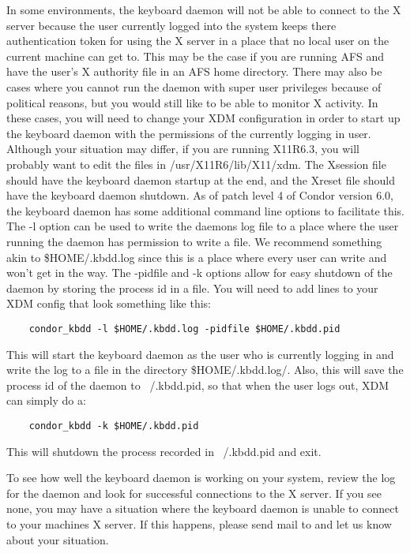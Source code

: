 In some environments, the keyboard daemon will not be able to connect to the X
server because the user currently logged into the system keeps there
authentication token for using the X server in a place that no local user on
the current machine can get to.  This may be the case if you are running AFS
and have the user's X authority file in an AFS home directory.  There may also
be cases where you cannot run the daemon with super user privileges because of
political reasons, but you would still like to be able to monitor X activity.
In these cases, you will need to change your XDM configuration in order to
start up the keyboard daemon with the permissions of the currently logging in
user.  Although your situation may differ, if you are running X11R6.3, you
will probably want to edit the files in /usr/X11R6/lib/X11/xdm.  The Xsession
file should have the keyboard daemon startup at the end, and the Xreset file
should have the keyboard daemon shutdown.  As of patch level 4 of Condor
version 6.0, the keyboard daemon has some additional command line options to
facilitate this.  The -l option can be used to write the daemons log file to a
place where the user running the daemon has permission to write a file.  We
recommend something akin to \$HOME/.kbdd.log since this is a place where every
user can write and won't get in the way.  The -pidfile and -k options allow
for easy shutdown of the daemon by storing the process id in a file.  You will
need to add lines to your XDM config that look something like this:

\begin{verbatim}
	condor_kbdd -l $HOME/.kbdd.log -pidfile $HOME/.kbdd.pid
\end{verbatim}

This will start the keyboard daemon as the user who is currently logging in
and write the log to a file in the directory \$HOME/.kbdd.log/.  Also, this
will save the process id of the daemon to ~/.kbdd.pid, so that when the user
logs out, XDM can simply do a:

\begin{verbatim}
	condor_kbdd -k $HOME/.kbdd.pid
\end{verbatim}

This will shutdown the process recorded in ~/.kbdd.pid and exit.

To see how well the keyboard daemon is working on your system, review
the log for the daemon and look for successful connections to the X
server.  If you see none, you may have a situation where the keyboard
daemon is unable to connect to your machines X server.  If this
happens, please send mail to  and let
us know about your situation.

